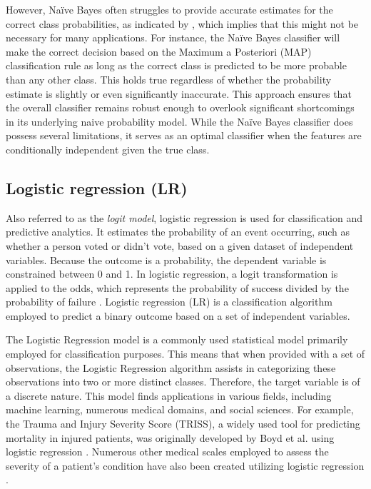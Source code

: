 However, Naïve Bayes often struggles to provide accurate estimates for the correct class probabilities, as indicated by \cite{Niculescu_Mizil2005}, which implies that this might not be necessary for many applications. For instance, the Naïve Bayes classifier will make the correct decision based on the Maximum a Posteriori (MAP) \cite{MAP_WIKI} classification rule as long as the correct class is predicted to be more probable than any other class. This holds true regardless of whether the probability estimate is slightly or even significantly inaccurate. This approach ensures that the overall classifier remains robust enough to overlook significant shortcomings in its underlying naive probability model. While the Naïve Bayes classifier does possess several limitations, it serves as an optimal classifier when the features are conditionally independent given the true class.



\subsection{Logistic regression (LR)} %
\label{sub: Logistic_regression}

Also referred to as the \textit{logit model}, logistic regression is used for classification and predictive analytics. It estimates the probability of an event occurring, such as whether a person voted or didn't vote, based on a given dataset of independent variables. Because the outcome is a probability, the dependent variable is constrained between 0 and 1. In logistic regression, a logit transformation is applied to the odds, which represents the probability of success divided by the probability of failure \cite{IBM2022}. Logistic regression (LR) is a classification algorithm employed to predict a binary outcome based on a set of independent variables.

The Logistic Regression model is a commonly used statistical model primarily employed for classification purposes. This means that when provided with a set of observations, the Logistic Regression algorithm assists in categorizing these observations into two or more distinct classes. Therefore, the target variable is of a discrete nature. This model finds applications in various fields, including machine learning, numerous medical domains, and social sciences. For example, the Trauma and Injury Severity Score (TRISS), a widely used tool for predicting mortality in injured patients, was originally developed by Boyd et al. using logistic regression \cite{BOYD1987}. Numerous other medical scales employed to assess the severity of a patient's condition have also been created utilizing logistic regression \cite{NLM2023, Biondo2000, J_C_Marshall2023, Jean_Roger1993}.

